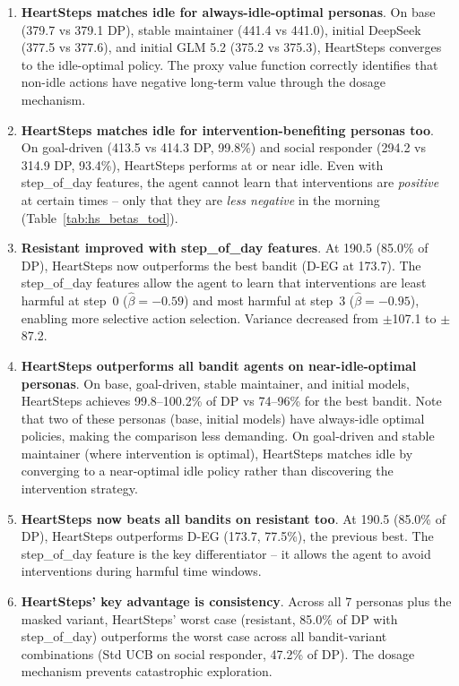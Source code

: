 \documentclass[11pt]{article}
\begin{document}
\begin{enumerate}
  \item \textbf{HeartSteps matches idle for always-idle-optimal personas}. On base (379.7 vs 379.1 DP), stable maintainer (441.4 vs 441.0), initial DeepSeek (377.5 vs 377.6), and initial GLM 5.2 (375.2 vs 375.3), HeartSteps converges to the idle-optimal policy. The proxy value function correctly identifies that non-idle actions have negative long-term value through the dosage mechanism.

  \item \textbf{HeartSteps matches idle for intervention-benefiting personas too}. On goal-driven (413.5 vs 414.3 DP, 99.8\%) and social responder (294.2 vs 314.9 DP, 93.4\%), HeartSteps performs at or near idle. Even with step\_of\_day features, the agent cannot learn that interventions are \emph{positive} at certain times -- only that they are \emph{less negative} in the morning (Table~\ref{tab:hs_betas_tod}).

  \item \textbf{Resistant improved with step\_of\_day features}. At 190.5 (85.0\% of DP), HeartSteps now outperforms the best bandit (D-EG at 173.7). The step\_of\_day features allow the agent to learn that interventions are least harmful at step~0 ($\hat{\beta} = -0.59$) and most harmful at step~3 ($\hat{\beta} = -0.95$), enabling more selective action selection. Variance decreased from $\pm$107.1 to $\pm$87.2.

  \item \textbf{HeartSteps outperforms all bandit agents on near-idle-optimal personas}. On base, goal-driven, stable maintainer, and initial models, HeartSteps achieves 99.8--100.2\% of DP vs 74--96\% for the best bandit. Note that two of these personas (base, initial models) have always-idle optimal policies, making the comparison less demanding. On goal-driven and stable maintainer (where intervention is optimal), HeartSteps matches idle by converging to a near-optimal idle policy rather than discovering the intervention strategy.

  \item \textbf{HeartSteps now beats all bandits on resistant too}. At 190.5 (85.0\% of DP), HeartSteps outperforms D-EG (173.7, 77.5\%), the previous best. The step\_of\_day feature is the key differentiator -- it allows the agent to avoid interventions during harmful time windows.

  \item \textbf{HeartSteps' key advantage is consistency}. Across all 7 personas plus the masked variant, HeartSteps' worst case (resistant, 85.0\% of DP with step\_of\_day) outperforms the worst case across all bandit-variant combinations (Std UCB on social responder, 47.2\% of DP). The dosage mechanism prevents catastrophic exploration.
\end{enumerate}
\end{document}
